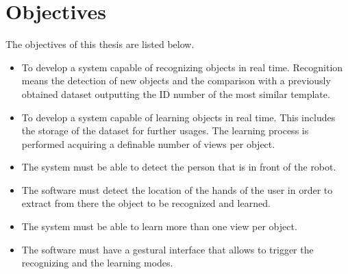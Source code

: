 \section{Objectives}
\label{objectives}

The objectives of this thesis are listed below. 

\begin{itemize}
	\item To develop a system capable of recognizing objects in real time. 
			Recognition means the detection of new objects and the comparison with a previously obtained dataset outputting the ID number of the most similar template.
	\item To develop a system capable of learning objects in real time. 
			This includes the storage of the dataset for further usages.
			The learning process is performed acquiring a definable number of views per object. 
	\item The system must be able to detect the person that is in front of the robot. 
	\item The software must detect the location of the hands of the user in order to extract from there the object to be recognized and learned. 
	\item The system must be able to learn more than one view per object. 
	\item The software must have a gestural interface that allows to trigger the recognizing and the learning modes. 

\end{itemize}
\\




